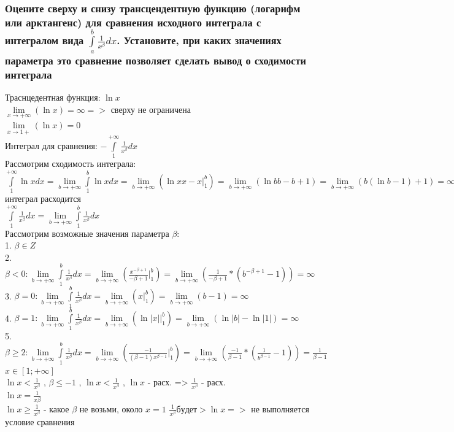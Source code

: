 \documentclass{article}
\begin{document}
\subsubsection{Оцените сверху и снизу трансцендентную функцию (логарифм или арктангенс) для сравнения исходного интеграла с интегралом вида $ \int\limits^b_a \frac{1}{x^{\beta}}dx $. Установите, при каких значениях параметра это сравнение позволяет сделать вывод о сходимости интеграла}
Траснцедентная функция: $ \ln{x} $\\
$ \lim\limits_{x \to +\infty} (\ln{x}) = \infty => $ сверху не ограничена\\
$ \lim\limits_{x \to 1+} (\ln{x}) = 0 $\\
Интеграл для сравнения: $ -\int\limits^{+\infty}_{1} \frac{1}{x^{\beta}}dx $\\
Рассмотрим сходимость интеграла:\\
$ \int\limits^{+\infty}_{1} \ln{x}dx = \lim\limits_{b \to +\infty} \int\limits^{b}_{1} \ln{x}dx = \lim\limits_{b \to +\infty} (\ln{x}x - x |^b_1) = \lim\limits_{b \to +\infty} (\ln{b}b - b + 1) = \lim\limits_{b \to +\infty} (b(\ln{b} - 1) + 1) = \infty => $ интеграл расходится\\
$ \int\limits^{+\infty}_1 \frac{1}{x^{\beta}}dx = \lim\limits_{b \to +\infty} \int\limits^b_1 \frac{1}{x^{\beta}}dx $\\
Рассмотрим возможные значения параметра $\beta$:\\
1. $ \beta \in Z $\\
2. $ \beta < 0 : \lim\limits_{b \to +\infty} \int\limits^b_1 \frac{1}{x^{\beta}}dx = \lim\limits_{b \to +\infty} (\frac{x^{-\beta + 1}}{-\beta + 1} |^b_1) = \lim\limits_{b \to +\infty} (\frac{1}{-\beta+1}*(b^{-\beta+1} - 1)) = \infty $\\
3. $ \beta = 0 : \lim\limits_{b \to +\infty} \int\limits^b_1 \frac{1}{x^{\beta}}dx = \lim\limits_{b \to +\infty} (x |^b_1) = \lim\limits_{b \to +\infty} (b - 1) = \infty $\\
4. $ \beta = 1 : \lim\limits_{b \to +\infty} \int\limits^b_1 \frac{1}{x^{\beta}}dx = \lim\limits_{b \to +\infty} (\ln{|x| |^b_1}) = \lim\limits_{b \to +\infty} (\ln{|b|} - \ln{|1|}) = \infty $\\
5. $ \beta \ge 2 : \lim\limits_{b \to +\infty} \int\limits^b_1 \frac{1}{x^{\beta}}dx = \lim\limits_{b \to +\infty} (\frac{-1}{(\beta - 1) x^{\beta - 1}} |^b_1) = \lim\limits_{b \to +\infty} (\frac{-1}{\beta - 1} * (\frac{1}{b^{\beta - 1}} - 1)) = \frac{1}{\beta - 1} $\\
\small $ x \in [1; +\infty] $\\
\normalsize
$ \ln{x} < \frac{1}{x^\beta} $ , $ \beta \leq -1 $ , $ \ln{x} < \frac{1}{x^{\beta}} $ , $ \ln{x} $ - расх. => $ \frac{1}{x^{\beta}} $ - расх.\\
$ \ln{x} = \frac{1}{x{\beta}} $ \\
$ \ln{x} \ge \frac{1}{x^{\beta}} $ - какое $\beta$ не возьми, около $ x = 1 $ $ \frac{1}{x^{\beta}} будет > \ln{x} => $ не выполняется условие сравнения
\end{document}
